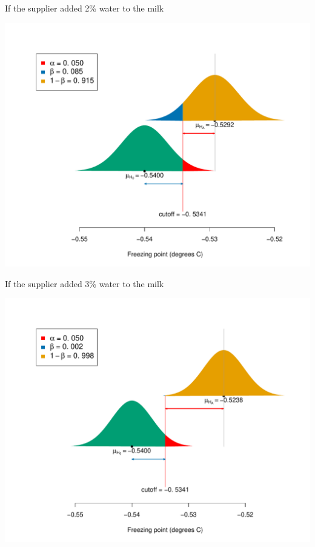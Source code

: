 \documentclass[handout]{beamer}\usepackage[]{graphicx}\usepackage[]{color}
\newenvironment{knitrout}{}{} %
\begin{document}
\begin{frame}[fragile]{If the supplier added 2\% water to the milk}
\begin{knitrout}\scriptsize
{}\color{fgcolor}

{\centering \includegraphics[width=1\linewidth]{figure/unnamed-chunk-8-1} 

}



\end{knitrout}
\end{frame}

\begin{frame}[fragile]{If the supplier added 3\% water to the milk}
\begin{knitrout}\scriptsize
{}\color{fgcolor}

{\centering \includegraphics[width=1\linewidth]{figure/unnamed-chunk-9-1} 

}



\end{knitrout}
\end{frame}
\end{document}
